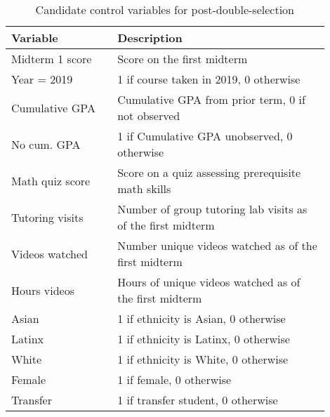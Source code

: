 \begin{spacing}{1.0} 
\begin{table} \centering \caption{Candidate control variables for post-double-selection} 
\label{controlvars_desc} 
\begin{threeparttable} 
\begin{tabular}{p{0.3\linewidth} p{0.6\linewidth}}
\toprule
        Variable &                                                  Description \\
\midrule
 Midterm 1 score &                                   Score on the first midterm \\
     Year = 2019 &                       1 if course taken in 2019, 0 otherwise \\
  Cumulative GPA &            Cumulative GPA from prior term, 0 if not observed \\
     No cum. GPA &                  1 if Cumulative GPA unobserved, 0 otherwise \\
 Math quiz score &           Score on a quiz assessing prerequisite math skills \\
 Tutoring visits &  Number of group tutoring lab visits as of the first midterm \\
  Videos watched &         Number unique videos watched as of the first midterm \\
    Hours videos &       Hours of unique videos watched as of the first midterm \\
           Asian &                         1 if ethnicity is Asian, 0 otherwise \\
          Latinx &                        1 if ethnicity is Latinx, 0 otherwise \\
           White &                         1 if ethnicity is White, 0 otherwise \\
          Female &                                     1 if female, 0 otherwise \\
        Transfer &                           1 if transfer student, 0 otherwise \\
\bottomrule
\end{tabular}
\end{threeparttable}
\end{table} 
\end{spacing}